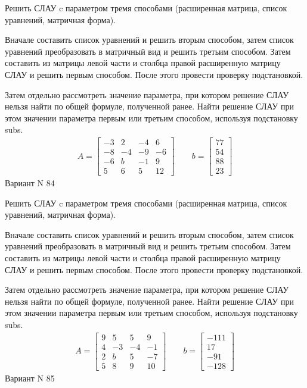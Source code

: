 \documentclass[11pt]{report}
\begin{document}
Решить СЛАУ c параметром тремя способами (расширенная матрица, список уравнений, матричная форма).

Вначале составить список уравнений и решить вторым способом,
затем список уравнений преобразовать в матричный вид и решить третьим способом.
Затем составить из матрицы левой части и столбца правой расширенную матрицу СЛАУ и решить первым способом.
После этого провести проверку подстановкой.

Затем отдельно рассмотреть значение параметра, при котором решение СЛАУ нельзя найти по общей формуле,
полученной ранее.
Найти решение СЛАУ при этом значении параметра первым или третьим способом, используя подстановку subs.
\begin{align*}
    A = \left[\begin{matrix}-3 & 2 & -4 & 6\\-8 & -4 & -9 & -6\\-6 & b & -1 & 9\\5 & 6 & 5 & 12\end{matrix}\right]
\qquad b = \left[\begin{matrix}77\\54\\88\\23\end{matrix}\right]
\end{align*}
\newpage
Вариант N 84


Решить СЛАУ c параметром тремя способами (расширенная матрица, список уравнений, матричная форма).

Вначале составить список уравнений и решить вторым способом,
затем список уравнений преобразовать в матричный вид и решить третьим способом.
Затем составить из матрицы левой части и столбца правой расширенную матрицу СЛАУ и решить первым способом.
После этого провести проверку подстановкой.

Затем отдельно рассмотреть значение параметра, при котором решение СЛАУ нельзя найти по общей формуле,
полученной ранее.
Найти решение СЛАУ при этом значении параметра первым или третьим способом, используя подстановку subs.
\begin{align*}
    A = \left[\begin{matrix}9 & 5 & 5 & 9\\4 & -3 & -4 & -1\\2 & b & 5 & -7\\5 & 8 & 9 & 10\end{matrix}\right]
\qquad b = \left[\begin{matrix}-111\\17\\-91\\-128\end{matrix}\right]
\end{align*}
\newpage
Вариант N 85
\end{document}
